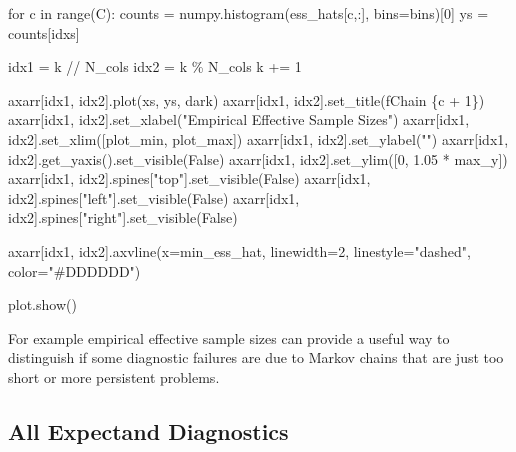 \documentclass[
  letterpaper,
  DIV=11,
  numbers=noendperiod]{scrartcl}
\newenvironment{Shaded}{\begin{snugshade}}{\end{snugshade}}
\newcommand{\BuiltInTok}[1]{\textcolor[rgb]{0.00,0.23,0.31}{#1}}
\newcommand{\ControlFlowTok}[1]{\textcolor[rgb]{0.00,0.23,0.31}{#1}}
\newcommand{\DecValTok}[1]{\textcolor[rgb]{0.68,0.00,0.00}{#1}}
\newcommand{\FloatTok}[1]{\textcolor[rgb]{0.68,0.00,0.00}{#1}}
\newcommand{\KeywordTok}[1]{\textcolor[rgb]{0.00,0.23,0.31}{#1}}
\newcommand{\NormalTok}[1]{\textcolor[rgb]{0.00,0.23,0.31}{#1}}
\newcommand{\OperatorTok}[1]{\textcolor[rgb]{0.37,0.37,0.37}{#1}}
\newcommand{\SpecialCharTok}[1]{\textcolor[rgb]{0.37,0.37,0.37}{#1}}
\newcommand{\SpecialStringTok}[1]{\textcolor[rgb]{0.13,0.47,0.30}{#1}}
\newcommand{\StringTok}[1]{\textcolor[rgb]{0.13,0.47,0.30}{#1}}
\newcommand{\VariableTok}[1]{\textcolor[rgb]{0.07,0.07,0.07}{#1}}
\begin{document}
\begin{Shaded}
\begin{Highlighting}[]
  \ControlFlowTok{for}\NormalTok{ c }\KeywordTok{in} \BuiltInTok{range}\NormalTok{(C):}
\NormalTok{    counts }\OperatorTok{=}\NormalTok{ numpy.histogram(ess\_hats[c,:], bins}\OperatorTok{=}\NormalTok{bins)[}\DecValTok{0}\NormalTok{]}
\NormalTok{    ys }\OperatorTok{=}\NormalTok{ counts[idxs]}

\NormalTok{    idx1 }\OperatorTok{=}\NormalTok{ k }\OperatorTok{//}\NormalTok{ N\_cols}
\NormalTok{    idx2 }\OperatorTok{=}\NormalTok{ k }\OperatorTok{\%}\NormalTok{ N\_cols}
\NormalTok{    k }\OperatorTok{+=} \DecValTok{1}

\NormalTok{    axarr[idx1, idx2].plot(xs, ys, dark)}
\NormalTok{    axarr[idx1, idx2].set\_title(}\SpecialStringTok{f\textquotesingle{}Chain }\SpecialCharTok{\{}\NormalTok{c }\OperatorTok{+} \DecValTok{1}\SpecialCharTok{\}}\SpecialStringTok{\textquotesingle{}}\NormalTok{)}
\NormalTok{    axarr[idx1, idx2].set\_xlabel(}\StringTok{"Empirical Effective Sample Sizes"}\NormalTok{)}
\NormalTok{    axarr[idx1, idx2].set\_xlim([plot\_min, plot\_max])}
\NormalTok{    axarr[idx1, idx2].set\_ylabel(}\StringTok{""}\NormalTok{)}
\NormalTok{    axarr[idx1, idx2].get\_yaxis().set\_visible(}\VariableTok{False}\NormalTok{)}
\NormalTok{    axarr[idx1, idx2].set\_ylim([}\DecValTok{0}\NormalTok{, }\FloatTok{1.05} \OperatorTok{*}\NormalTok{ max\_y])}
\NormalTok{    axarr[idx1, idx2].spines[}\StringTok{"top"}\NormalTok{].set\_visible(}\VariableTok{False}\NormalTok{)}
\NormalTok{    axarr[idx1, idx2].spines[}\StringTok{"left"}\NormalTok{].set\_visible(}\VariableTok{False}\NormalTok{)}
\NormalTok{    axarr[idx1, idx2].spines[}\StringTok{"right"}\NormalTok{].set\_visible(}\VariableTok{False}\NormalTok{)}

\NormalTok{    axarr[idx1, idx2].axvline(x}\OperatorTok{=}\NormalTok{min\_ess\_hat, linewidth}\OperatorTok{=}\DecValTok{2}\NormalTok{,}
\NormalTok{                              linestyle}\OperatorTok{=}\StringTok{"dashed"}\NormalTok{,}
\NormalTok{                              color}\OperatorTok{=}\StringTok{"\#DDDDDD"}\NormalTok{)}

\NormalTok{  plot.show()}
\end{Highlighting}
\end{Shaded}

For example empirical effective sample sizes can provide a useful way to
distinguish if some diagnostic failures are due to Markov chains that
are just too short or more persistent problems.

\subsection{All Expectand Diagnostics}\label{all-expectand-diagnostics}
\end{document}
